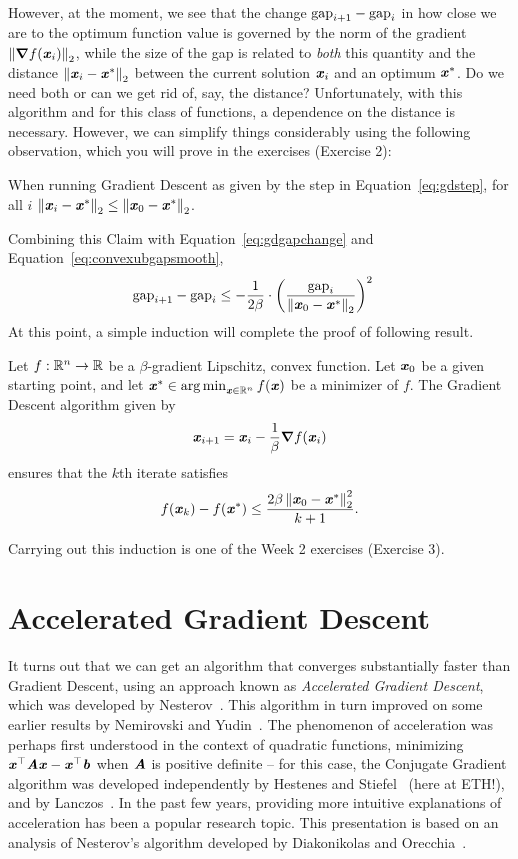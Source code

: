 However, at the moment, we see that the change $\gap_{i+1}- \gap_i$
in how close we are to the optimum function value is governed by the norm of the gradient $\norm{\grad
  f(\xx_{i})}_2$, while the size of the gap is related to \emph{both}
this quantity and the distance $\norm{\xx_i - \xx^*}_2$ between the
current solution $\xx_i$ and an optimum $\xx^*$.
Do we need both or can we get rid of, say, the distance?
Unfortunately, with this algorithm and for this class of functions, a
dependence on the distance is necessary.
However, we can simplify things considerably using the following
observation, which you will prove in the exercises (Exercise 2):
\begin{claim}
  \label{clm:gdoptdist}
  When running Gradient Descent as given by the step in
  Equation~\eqref{eq:gdstep},  for all $i$
  $\norm{\xx_i - \xx^*}_2 \leq \norm{\xx_0 - \xx^*}_2$.
\end{claim}
Combining this Claim with Equation~\eqref{eq:gdgapchange} and Equation~\eqref{eq:convexubgapsmooth},
\begin{align}
\label{eq:convexgapsmooth}
  \gap_{i+1}- \gap_i
  &\leq
    -
    \frac{1}{2\beta}
    \cdot
    \left(
    \frac{\gap_i}{\norm{\xx_0 - \xx^*}_2 }
    \right)^2
\end{align}
At this point, a simple induction will complete the proof of following result.
\begin{theorem}
  \label{thm:gdsmoothconv}
  Let $f : \R^n \to \R$ be a $\beta$-gradient Lipschitz, convex
  function.
  Let $\xx_0$ be a given starting point,
  and let $\xx^* \in \argmin_{\xx \in \R^n} f(\xx)$ be a minimizer of $f$.
 The Gradient Descent algorithm given by
  \[
   \xx_{i+1} = \xx_{i} - \frac{1}{\beta} \grad f(\xx_{i})
 \]
 ensures that the $k$th iterate satisfies
 \[
   f(\xx_{k}) - f(\xx^*)\leq \frac{2\beta \norm{\xx_0 - \xx^*}_2^2}{k+1}
   .
   \]
\end{theorem}
Carrying out this induction is one of the Week 2 exercises (Exercise 3).

\section{Accelerated Gradient Descent}


It turns out that we can get an algorithm that converges substantially
faster than Gradient Descent, using an approach known as
\emph{Accelerated Gradient Descent}, which was developed by
Nesterov~\cite{n83}.
This algorithm in turn improved on some earlier results by Nemirovski and Yudin~\cite{ny83}.
The phenomenon of acceleration was perhaps first understood in the context of
quadratic functions, minimizing $\xx^\trp \AA \xx - \xx^\trp \bb$
when $\AA$ is positive definite -- for this case, the Conjugate
Gradient algorithm was developed independently by Hestenes and
Stiefel~\cite{hs52} (here at ETH!), and by Lanczos~\cite{l52}.
In the past few years, providing more intuitive explanations of
acceleration has been a popular research topic.
This presentation is based on an analysis of Nesterov's algorithm
developed by Diakonikolas and Orecchia~\cite{do19}.

